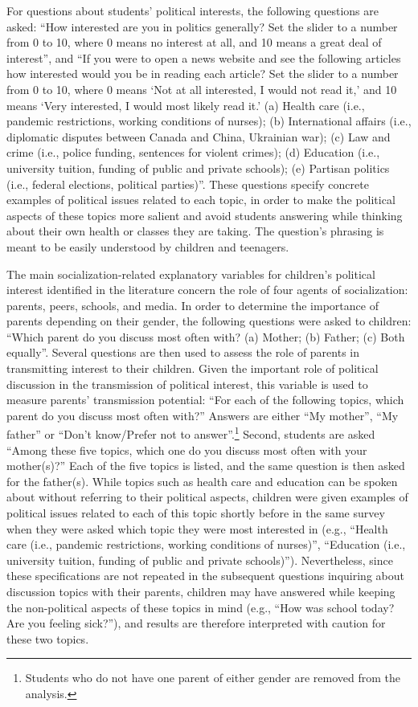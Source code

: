 \documentclass[
  letterpaper,
  DIV=11,
  numbers=noendperiod]{scrreprt}
\begin{document}
For questions about students' political interests, the following
questions are asked: ``How interested are you in politics generally? Set
the slider to a number from 0 to 10, where 0 means no interest at all,
and 10 means a great deal of interest'', and ``If you were to open a
news website and see the following articles how interested would you be
in reading each article? Set the slider to a number from 0 to 10, where
0 means `Not at all interested, I would not read it,' and 10 means `Very
interested, I would most likely read it.' (a) Health care (i.e.,
pandemic restrictions, working conditions of nurses); (b) International
affairs (i.e., diplomatic disputes between Canada and China, Ukrainian
war); (c) Law and crime (i.e., police funding, sentences for violent
crimes); (d) Education (i.e., university tuition, funding of public and
private schools); (e) Partisan politics (i.e., federal elections,
political parties)''. These questions specify concrete examples of
political issues related to each topic, in order to make the political
aspects of these topics more salient and avoid students answering while
thinking about their own health or classes they are taking. The
question's phrasing is meant to be easily understood by children and
teenagers.

The main socialization-related explanatory variables for children's
political interest identified in the literature concern the role of four
agents of socialization: parents, peers, schools, and media. In order to
determine the importance of parents depending on their gender, the
following questions were asked to children: ``Which parent do you
discuss most often with? (a) Mother; (b) Father; (c) Both equally''.
Several questions are then used to assess the role of parents in
transmitting interest to their children. Given the important role of
political discussion in the transmission of political interest, this
variable is used to measure parents' transmission potential: ``For each
of the following topics, which parent do you discuss most often with?''
Answers are either ``My mother'', ``My father'' or ``Don't know/Prefer
not to answer''.\footnote{Students who do not have one parent of either
  gender are removed from the analysis.} Second, students are asked
``Among these five topics, which one do you discuss most often with your
mother(s)?'' Each of the five topics is listed, and the same question is
then asked for the father(s). While topics such as health care and
education can be spoken about without referring to their political
aspects, children were given examples of political issues related to
each of this topic shortly before in the same survey when they were
asked which topic they were most interested in (e.g., ``Health care
(i.e., pandemic restrictions, working conditions of nurses)'',
``Education (i.e., university tuition, funding of public and private
schools)''). Nevertheless, since these specifications are not repeated
in the subsequent questions inquiring about discussion topics with their
parents, children may have answered while keeping the non-political
aspects of these topics in mind (e.g., ``How was school today? Are you
feeling sick?''), and results are therefore interpreted with caution for
these two topics.
\end{document}
